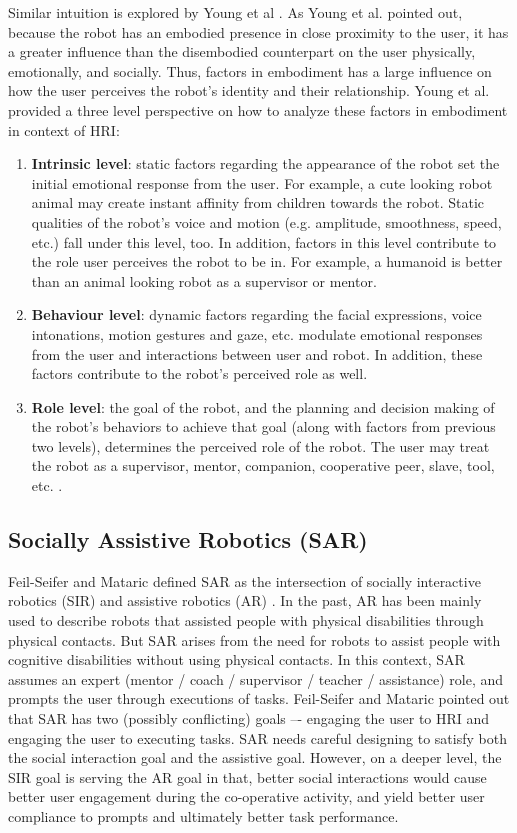 \documentclass{ut-thesis}
\begin{document}
Similar intuition is explored by Young et al \cite{young2011evaluating}.  As Young et al. pointed out, because the robot has an embodied presence in close proximity to the user, it has a greater influence than the disembodied counterpart on the user physically, emotionally, and socially. Thus, factors in embodiment has a large influence on how the user perceives the robot's identity and their relationship.  Young et al. provided a three level perspective on how to analyze these factors in embodiment in context of HRI:
\begin{enumerate}
	\item \textbf{Intrinsic level}: static factors regarding the appearance of the robot set the initial emotional response from the user.  For example, a cute looking robot animal may create instant affinity from children towards the robot.  Static qualities of the robot's voice and motion (e.g. amplitude, smoothness, speed, etc.) fall under this level, too.  In addition, factors in this level contribute to the role user perceives the robot to be in.  For example, a humanoid is better than an animal looking robot as a supervisor or mentor.

	\item \textbf{Behaviour level}: dynamic factors regarding the facial expressions, voice intonations, motion gestures and gaze, etc. modulate emotional responses from the user and interactions between user and robot.  In addition, these factors contribute to the robot's perceived role as well.

	\item \textbf{Role level}: the goal of the robot, and the planning and decision making of the robot's behaviors to achieve that goal (along with factors from previous two levels), determines the perceived role of the robot.  The user may treat the robot as a supervisor, mentor, companion, cooperative peer, slave, tool, etc. \cite{goodrich2007human}.
\end{enumerate}


\subsection{Socially Assistive Robotics (SAR)}
Feil-Seifer and Mataric defined SAR as the intersection of socially interactive robotics (SIR) and assistive robotics (AR) \cite{feil2005defining}.  In the past, AR has been mainly used to describe robots that assisted people with physical disabilities through physical contacts.  But SAR arises from the need for robots to assist people with cognitive disabilities without using physical contacts.  In this context, SAR assumes an expert (mentor / coach / supervisor / teacher / assistance) role, and prompts the user through executions of tasks.  Feil-Seifer and Mataric pointed out that SAR has two (possibly conflicting) goals –- engaging the user to HRI and engaging the user to executing tasks.  SAR needs careful designing to satisfy both the social interaction goal and the assistive goal.  However, on a deeper level, the SIR goal is serving the AR goal in that, better social interactions would cause better user engagement during the co-operative activity, and yield better user compliance to prompts and ultimately better task performance.
\end{document}
